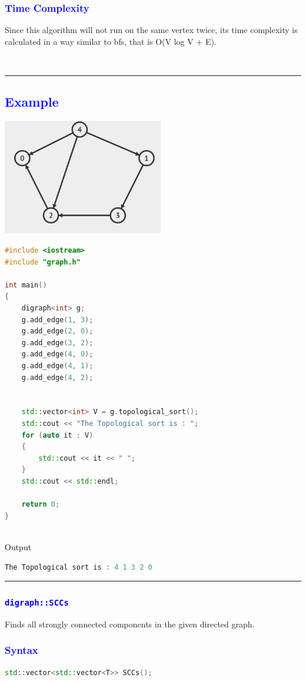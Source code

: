 \documentclass[11pt,a4paper]{article}
\begin{document}
\subsubsection*{\textcolor{blue}{ \large {Time Complexity}}}
Since this algorithm will not run on the same vertex twice, its time complexity is calculated in a way similar to bfs, that is O(V log V + E).


\\
\rule{17cm}{0.1mm}
\subsection*{\textcolor{blue}{\Large Example }}
\includegraphics[width=70mm]{example4.png}
\begin{lstlisting}[language=C++]
#include <iostream>
#include "graph.h"

int main()
{
    digraph<int> g;
    g.add_edge(1, 3);
    g.add_edge(2, 0);
    g.add_edge(3, 2);
    g.add_edge(4, 0);
    g.add_edge(4, 1);
    g.add_edge(4, 2);

    
    std::vector<int> V = g.topological_sort();
    std::cout << "The Topological sort is : ";
    for (auto it : V)
    {
        std::cout << it << " ";
    }
    std::cout << std::endl;
    
    return 0;
}

\end{lstlisting}
\\
{\textcolor{black}{\normalsize Output }}
\begin{lstlisting}[language=C++]
The Topological sort is : 4 1 3 2 0 
\end{lstlisting}
\rule{17cm}{0.1mm}
\subsubsection*{\textcolor{blue}{\Large\texttt{digraph::SCCs}}}
Finds all strongly connected components in the given directed graph.



\subsubsection*{\textcolor{blue}{ \large {Syntax}}}
\begin{lstlisting}[language=C++]
std::vector<std::vector<T>> SCCs();

\end{lstlisting}
\end{document}
